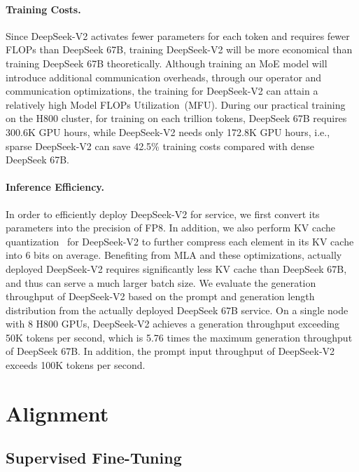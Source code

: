 \documentclass[11pt, a4paper, logo, copyright, nonumbering]{deepseek}
\newcommand{\dsvi}{DeepSeek 67B}
\newcommand{\dsvii}{DeepSeek-V2}
\newcommand{\dsattn}{MLA}
\begin{document}
\begin{CJK*}{UTF8}{gbsn}
\paragraph{Training Costs.}
Since \dsvii{} activates fewer parameters for each token and requires fewer FLOPs than \dsvi{}, training \dsvii{} will be more economical than training \dsvi{} theoretically. 
Although training an MoE model will introduce additional communication overheads, through our operator and communication optimizations, the training for \dsvii{} can attain a relatively high Model FLOPs Utilization~(MFU). 
During our practical training on the H800 cluster, for training on each trillion tokens, \dsvi{} requires 300.6K GPU hours, while \dsvii{} needs only 172.8K GPU hours, i.e., sparse \dsvii{} can save 42.5\% training costs compared with dense \dsvi{}. 

\paragraph{Inference Efficiency.}
In order to efficiently deploy \dsvii{} for service, we first convert its parameters into the precision of FP8. 
In addition, we also perform KV cache quantization~\citep{kv_quant,atom} for \dsvii{} to further compress each element in its KV cache into 6 bits on average. 
Benefiting from \dsattn{} and these optimizations, actually deployed \dsvii{} requires significantly less KV cache than \dsvi{}, and thus can serve a much larger batch size. 
We evaluate the generation throughput of \dsvii{} based on the prompt and generation length distribution from the actually deployed \dsvi{} service. 
On a single node with 8 H800 GPUs, \dsvii{} achieves a generation throughput exceeding 50K tokens per second, which is 5.76 times the maximum generation throughput of \dsvi{}. 
In addition, the prompt input throughput of \dsvii{} exceeds 100K tokens per second. 

\section{Alignment}
\label{sec:alignment}

\subsection{Supervised Fine-Tuning}


\end{CJK*}
\end{document}
